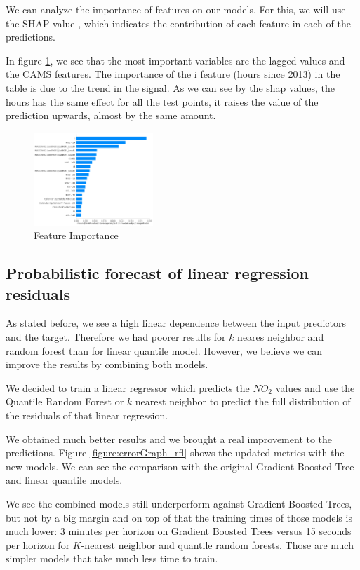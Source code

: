 \documentclass[a4paper,twocolumn,5p]{elsarticle}
\begin{document}
We can analyze the importance of features on our models. For 
this, we will use the SHAP value \cite{lundberg_unified_2017}, which indicates 
the contribution of each feature in each of the predictions.

In figure \ref{figure:imp_feat}, we see that the most important variables 
are the lagged values and the CAMS 
features. The importance of the i feature (hours since 2013) in the table 
is due to the 
trend in the signal. As we can see by the shap values, the hours has the 
same effect for all the test points, it raises the value of the prediction 
upwards, almost by the same amount.

\begin{figure}
  \centering
  \includegraphics[width=0.4\textwidth]{imp_feat}
  \caption{Feature Importance}
  \label{figure:imp_feat}
\end{figure}


\subsection{Probabilistic forecast of linear regression residuals}

As stated before, we see a high linear dependence 
between the input predictors and the target. Therefore we had 
poorer results for $k$ neares neighbor and random forest than
for linear quantile model. However, we believe we can improve the 
results by combining both models. 

We decided to train a linear regressor
which predicts the $NO_2$ values and use the Quantile 
Random Forest or $k$ nearest neighbor to predict 
the full distribution of the residuals of that linear regression.  

We obtained much better results and 
we brought a real improvement to the predictions. Figure 
\ref{figure:errorGraph_rfl} shows the updated metrics with the new models.
We can see the comparison 
with the original Gradient Boosted Tree 
and linear quantile models.

We see the combined models still underperform against Gradient Boosted 
Trees, but not by a big margin and on top of that 
the training 
times of those models is much lower: 3 minutes per horizon on Gradient 
Boosted Trees versus 15 seconds
per horizon for $K$-nearest neighbor and
quantile random forests. Those are 
much simpler models that take much less time to train.
\end{document}
